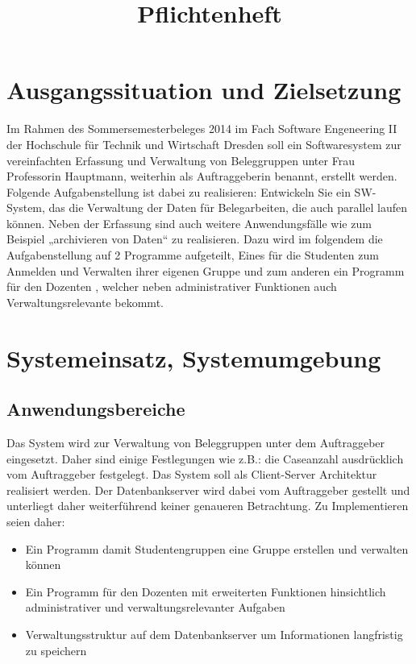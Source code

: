 \documentclass{article}
\title{Pflichtenheft}
\begin{document}
\maketitle
\newpage
\tableofcontents
\newpage

\section{Ausgangssituation und Zielsetzung}
Im Rahmen des Sommersemesterbeleges 2014 im Fach Software Engeneering II der Hochschule für Technik und Wirtschaft Dresden soll ein Softwaresystem zur vereinfachten Erfassung und Verwaltung von Beleggruppen unter Frau Professorin Hauptmann, weiterhin als Auftraggeberin benannt, erstellt werden.
Folgende Aufgabenstellung ist dabei zu realisieren:
Entwickeln  Sie ein SW-System, das die Verwaltung der Daten für Belegarbeiten, die auch parallel laufen können. Neben der Erfassung sind auch weitere Anwendungsfälle wie zum Beispiel „archivieren von Daten“ zu realisieren.
Dazu wird im folgendem die Aufgabenstellung auf 2 Programme aufgeteilt, Eines für die Studenten zum Anmelden und Verwalten ihrer eigenen Gruppe und zum anderen ein Programm für den Dozenten , welcher neben administrativer Funktionen auch Verwaltungsrelevante bekommt.

\section{Systemeinsatz, Systemumgebung}
\subsection{Anwendungsbereiche}
Das System wird zur Verwaltung von Beleggruppen unter dem Auftraggeber eingesetzt. Daher sind einige Festlegungen wie z.B.: die Caseanzahl ausdrücklich vom Auftraggeber festgelegt.
Das System soll als Client-Server Architektur realisiert werden. Der Datenbankserver wird dabei vom Auftraggeber gestellt und unterliegt daher weiterführend keiner genaueren Betrachtung. Zu Implementieren seien daher:
\begin{itemize}
\item Ein Programm damit Studentengruppen eine Gruppe erstellen und verwalten können
\item Ein Programm für den Dozenten mit erweiterten Funktionen hinsichtlich administrativer und verwaltungsrelevanter Aufgaben
\item Verwaltungsstruktur auf dem Datenbankserver um Informationen langfristig zu speichern
\end{itemize}
\end{document}
